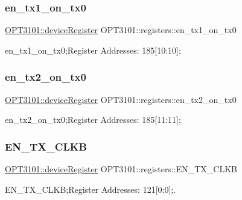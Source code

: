 \subsubsection{\texorpdfstring{en\+\_\+tx1\+\_\+on\+\_\+tx0}{en\_tx1\_on\_tx0}}
{\footnotesize\ttfamily \mbox{\hyperlink{class_o_p_t3101_1_1device_register}{O\+P\+T3101\+::device\+Register}} O\+P\+T3101\+::registers\+::en\+\_\+tx1\+\_\+on\+\_\+tx0}



en\+\_\+tx1\+\_\+on\+\_\+tx0;Register Addresses\+: 185\mbox{[}10\+:10\mbox{]}; 

\mbox{\label{class_o_p_t3101_1_1registers_abf81e8f737e0288f11211ecf48e698b7}} 
\subsubsection{\texorpdfstring{en\+\_\+tx2\+\_\+on\+\_\+tx0}{en\_tx2\_on\_tx0}}
{\footnotesize\ttfamily \mbox{\hyperlink{class_o_p_t3101_1_1device_register}{O\+P\+T3101\+::device\+Register}} O\+P\+T3101\+::registers\+::en\+\_\+tx2\+\_\+on\+\_\+tx0}



en\+\_\+tx2\+\_\+on\+\_\+tx0;Register Addresses\+: 185\mbox{[}11\+:11\mbox{]}; 

\mbox{\label{class_o_p_t3101_1_1registers_ae8ad9016ffaf4e1c06c5ea4ae9f51c1f}} 
\subsubsection{\texorpdfstring{E\+N\+\_\+\+T\+X\+\_\+\+C\+L\+KB}{EN\_TX\_CLKB}}
{\footnotesize\ttfamily \mbox{\hyperlink{class_o_p_t3101_1_1device_register}{O\+P\+T3101\+::device\+Register}} O\+P\+T3101\+::registers\+::\+E\+N\+\_\+\+T\+X\+\_\+\+C\+L\+KB}



E\+N\+\_\+\+T\+X\+\_\+\+C\+L\+KB;Register Addresses\+: 121\mbox{[}0\+:0\mbox{]};. 

